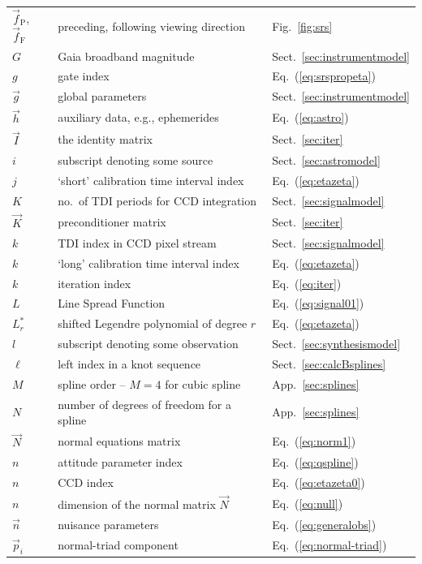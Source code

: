 \documentclass[structabstract]{aa}
\begin{document}
\begin{longtable}{lll}
$\vec{f}_\text{P}$, $\vec{f}_\text{F}$ & preceding, following viewing direction & Fig.~\ref{fig:srs} \\
$G$ & Gaia broadband magnitude & Sect.~\ref{sec:instrumentmodel} \\
$g$ & gate index & Eq.~(\ref{eq:srspropeta}) \\
$\vec{g}$ & global parameters & Sect.~\ref{sec:instrumentmodel} \\
$\vec{h}$ & auxiliary data, e.g., ephemerides &Eq.~(\ref{eq:astro})\\
$\vec{I}$ & the identity matrix  & Sect.~\ref{sec:iter} \\
$i$ & subscript denoting some source  & Sect.~\ref{sec:astromodel} \\
$j$ & `short' calibration time interval index  & Eq.~(\ref{eq:etazeta}) \\
$K$ & no.\ of TDI periods for CCD integration  & Sect.~\ref{sec:signalmodel} \\
$\vec{K}$ & preconditioner matrix & Sect.~\ref{sec:iter} \\
$k$ & TDI index in CCD pixel stream  & Sect.~\ref{sec:signalmodel} \\
$k$ & `long' calibration time interval index  & Eq.~(\ref{eq:etazeta}) \\
$k$ & iteration index  & Eq.~(\ref{eq:iter}) \\
$L$& Line Spread Function  & Eq.~(\ref{eq:signal01}) \\
$L_r^\ast$ & shifted Legendre polynomial of degree $r$ & Eq.~(\ref{eq:etazeta}) \\
$l$ & subscript denoting some observation  & Sect.~\ref{sec:synthesismodel} \\
$\ell$ & left index in a knot sequence  & Sect.~\ref{sec:calcBsplines} \\
$M$ & spline order -- $M=4$ for cubic spline & App.~\ref{sec:splines} \\
$N$ & number of degrees of freedom for a spline & App.~\ref{sec:splines} \\
$\vec{N}$ & normal equations matrix & Eq.~(\ref{eq:norm1}) \\
$n$ & attitude parameter index & Eq.~(\ref{eq:qspline}) \\
$n$ & CCD index & Eq.~(\ref{eq:etazeta0}) \\
$n$ & dimension of the normal matrix $\vec{N}$ & Eq.~(\ref{eq:null}) \\
$\vec{n}$ & nuisance parameters & Eq.~(\ref{eq:generalobs}) \\
$\vec{p}_i$ &  normal-triad component  & Eq.~(\ref{eq:normal-triad}) \\

\end{longtable}
\end{document}
